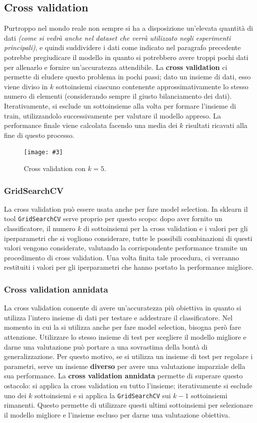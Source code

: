 \documentclass[12pt, twoside, letterpaper]{report}
\newcommand{\img}[4] {
	\begin{figure}
		\centering
		\texttt{[image: \#3]}\\
		\caption{#1}
		\label{fig:#4}
	\end{figure}
}
\begin{document}
			\subsection{Cross validation}
				Purtroppo nel mondo reale non sempre si ha a disposizione un'elevata quantità di dati \textit{(come si vedrà anche nel dataset che verrà utilizzato negli esperimenti principali)}, e quindi suddividere i dati come indicato nel paragrafo precedente potrebbe pregiudicare il modello in quanto si potrebbero avere troppi pochi dati per allenarlo e fornire un'accuratezza attendibile. La \textbf{cross validation} ci permette di eludere questo problema in pochi passi; dato un insieme di dati, esso viene diviso in $k$ sottoinsiemi ciascuno contenente approssimativamente lo stesso numero di elementi (considerando sempre il giusto bilanciamento dei dati). Iterativamente, si esclude un sottoinsieme alla volta per formare l'insieme di train, utilizzandolo successivamente per valutare il modello appreso. La performance finale viene calcolata facendo una media dei $k$ risultati ricavati alla fine di questo processo. 
				\img{Cross validation con $k = 5$.}{0.5}{cv.png}{cv}
				
				\subsubsection{GridSearchCV}
					La cross validation può essere usata anche per fare model selection. In sklearn il tool \texttt{GridSearchCV} \cite{sklearn} serve proprio per questo scopo: dopo aver fornito un classificatore, il numero $k$ di sottoinsiemi per la cross validation e i valori per gli iperparametri che si vogliono considerare, tutte le possibili combinazioni di questi valori vengono considerate, valutando la corrispondente performance tramite un procedimento di cross validation. Una volta finita tale procedura, ci verranno restituiti i valori per gli iperparametri che hanno portato la performance migliore.
				
				\subsubsection{Cross validation annidata}	
					La cross validation consente di avere un'accuratezza più obiettiva in quanto si utilizza l'intero insieme di dati per testare e addestrare il classificatore. Nel momento in cui la si utilizza anche per fare model selection, bisogna però fare attenzione. Utilizzare lo stesso insieme di test per scegliere il modello migliore e darne una valutazione può portare a una sovrastima della bontà di generalizzazione. Per questo motivo, se si utilizza un insieme di test per regolare i parametri, serve un insieme \textbf{diverso} per avere una valutazione imparziale della sua performance. La \textbf{cross validation annidata} permette di superare questo ostacolo: si applica la cross validation su tutto l'insieme; iterativamente si esclude uno dei $k$ sottoinsiemi e si applica la \texttt{GridSearchCV} sui $k-1$ sottoinsiemi rimanenti. Questo permette di utilizzare questi ultimi sottoinsiemi per selezionare il modello migliore e l'insieme escluso per darne una valutazione obiettiva.
				
\end{document}
